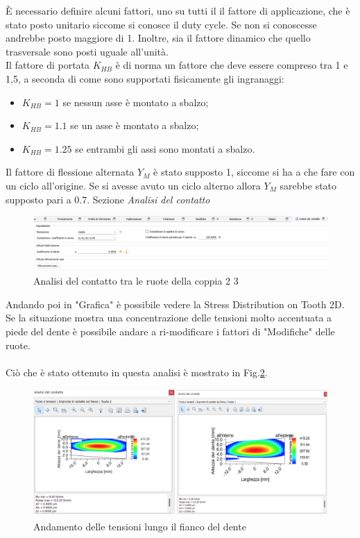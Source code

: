 È necessario definire alcuni fattori, uno su tutti il il fattore di applicazione, che è stato posto unitario siccome si conosce il duty cycle. Se non si conoscesse andrebbe posto maggiore di 1. Inoltre, sia il fattore dinamico che quello trasversale sono posti uguale all’unità.\\
Il fattore di portata $K_{HB}$ è di norma un fattore che deve essere compreso tra 1 e 1,5, a seconda di come sono supportati fisicamente gli ingranaggi: 
\begin{itemize}
    \item $K_{HB}=1$ se nessun asse è montato a sbalzo;
    \item $K_{HB}=1.1$ se un asse è montato a sbalzo;
    \item $K_{HB}=1.25$ se entrambi gli assi sono montati a sbalzo. 
\end{itemize}
Il fattore di flessione alternata $Y_M$ è stato supposto 1, siccome si ha a che fare con un ciclo all’origine. Se si avesse avuto un ciclo alterno allora $Y_M$ sarebbe stato supposto pari a 0.7.
\newpage
Sezione \emph{Analisi del contatto}
\begin{figure}[h]
    \centering
    \includegraphics[scale=0.45]{Immagini/AnalisiContattoCoppia23.png}
    \caption{Analisi del contatto tra le ruote della coppia 2 3}
    \label{fig:AnalisiContattoCoppia23}
\end{figure}

Andando poi in "Grafica" è possibile vedere la Stress Distribution on Tooth 2D. \\
Se la situazione mostra una concentrazione delle tensioni molto accentuata a piede del dente è possibile andare a ri-modificare i fattori di "Modifiche" delle ruote.\\
\\
Ciò che è stato ottenuto in questa analisi è mostrato in Fig.\ref{fig:StressDistributionCoppia23}.
\begin{figure}[h]
    \centering
    \includegraphics[scale=0.6]{Immagini/StressDistributionCoppia23.png}
    \caption{Andamento delle tensioni lungo il fianco del dente}
    \label{fig:StressDistributionCoppia23}
\end{figure}


